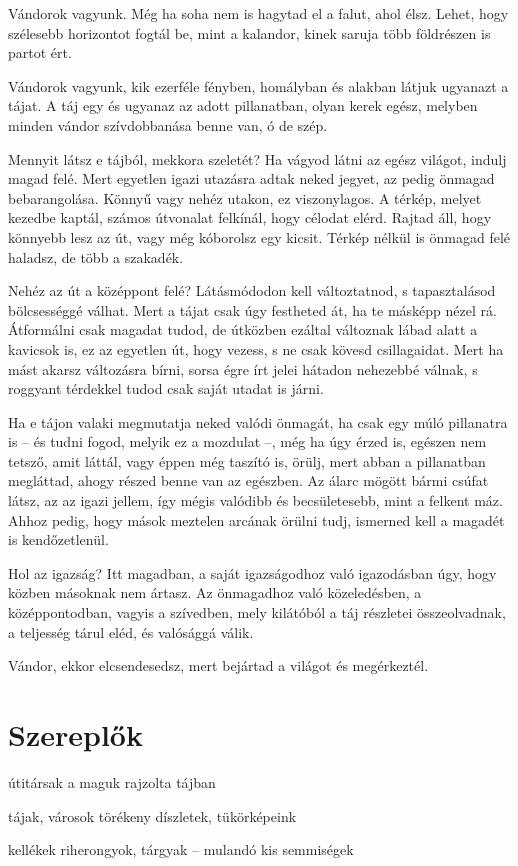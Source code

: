 \begin{itshape}
Vándorok vagyunk. Még ha soha nem is hagytad el a falut, ahol élsz. Lehet,
hogy szélesebb horizontot fogtál be, mint a kalandor, kinek saruja több
földrészen is partot ért.

Vándorok vagyunk, kik ezerféle fényben, homályban és alakban látjuk
ugyanazt a tájat. A táj egy és ugyanaz az adott pillanatban, olyan kerek
egész, melyben minden vándor szívdobbanása benne van, ó de szép.

Mennyit látsz e tájból, mekkora szeletét? Ha vágyod látni az egész világot,
indulj magad felé. Mert egyetlen igazi utazásra adtak neked jegyet,
az pedig önmagad bebarangolása. Könnyű vagy nehéz utakon, ez viszonylagos.
A térkép, melyet kezedbe kaptál, számos útvonalat felkínál, hogy
célodat elérd. Rajtad áll, hogy könnyebb lesz az út, vagy még kóborolsz egy
kicsit. Térkép nélkül is önmagad felé haladsz, de több a szakadék.

Nehéz az út a középpont felé? Látásmódodon kell változtatnod, s tapasztalásod
bölcsességgé válhat. Mert a tájat csak úgy festheted át, ha te
másképp nézel rá. Átformálni csak magadat tudod, de útközben ezáltal
változnak lábad alatt a kavicsok is, ez az egyetlen út, hogy vezess, s ne
csak kövesd csillagaidat. Mert ha mást akarsz változásra bírni, sorsa égre
írt jelei hátadon nehezebbé válnak, s roggyant térdekkel tudod csak saját
utadat is járni.

Ha e tájon valaki megmutatja neked valódi önmagát, ha csak egy múló
pillanatra is -- és tudni fogod, melyik ez a mozdulat --, még ha úgy érzed
is, egészen nem tetsző, amit láttál, vagy éppen még taszító is, örülj, mert
abban a pillanatban megláttad, ahogy részed benne van az egészben. Az
álarc mögött bármi csúfat látsz, az az igazi jellem, így mégis valódibb és
becsületesebb, mint a felkent máz. Ahhoz pedig, hogy mások meztelen arcának
örülni tudj, ismerned kell a magadét is kendőzetlenül.

Hol az igazság? Itt magadban, a saját igazságodhoz való igazodásban
úgy, hogy közben másoknak nem ártasz. Az önmagadhoz való közeledésben,
a középpontodban, vagyis a szívedben, mely kilátóból a táj részletei
összeolvadnak, a teljesség tárul eléd, és valósággá válik.

Vándor, ekkor elcsendesedsz, mert bejártad a világot és megérkeztél.
\end{itshape}

\section{Szereplők}

\begin{list}{}{\def\makelabel#1{#1 --}}
\item[útitársak]	a maguk rajzolta tájban
\item[tájak, városok]	törékeny díszletek, tükörképeink
\item[kellékek]		riherongyok, tárgyak -- mulandó kis semmiségek
\end{list}

\normalfont
